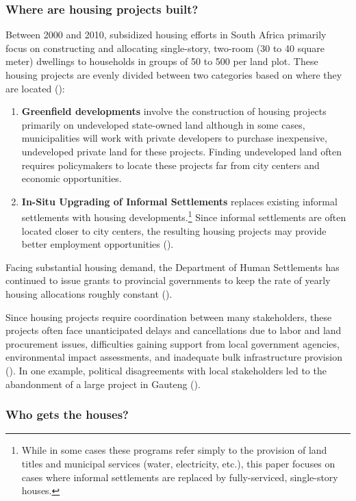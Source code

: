 \documentclass[12pt]{article}
\begin{document}
\subsubsection{Where are housing projects built?}

Between 2000 and 2010, subsidized housing efforts in South Africa primarily focus on constructing and allocating single-story, two-room (30 to 40 square meter) dwellings to households in groups of 50 to 500 per land plot.  These housing projects are evenly divided between two categories based on where they are located (\cite{dhsreports}):
\begin{enumerate}
	\item  \textbf{Greenfield developments} involve the construction of housing projects primarily on undeveloped state-owned land although in some cases, municipalities will work with private developers to purchase inexpensive, undeveloped private land for these projects.  Finding undeveloped land often requires policymakers to locate these projects far from city centers and economic opportunities.
	\item  \textbf{In-Situ Upgrading of Informal Settlements} replaces existing informal settlements with housing developments.\footnote{While in some cases these programs refer simply to the provision of land titles and municipal services (water, electricity, etc.), this paper focuses on cases where informal settlements are replaced by fully-serviced, single-story houses.}  Since informal settlements are often located closer to city centers, the resulting housing projects may provide better employment opportunities (\cite{serihistory}).
\end{enumerate}
Facing substantial housing demand, the Department of Human Settlements has continued to issue grants to provincial governments to keep the rate of yearly housing allocations roughly constant (\cite{dhsreports}).

Since housing projects require coordination between many stakeholders, these projects often face unanticipated delays and cancellations due to labor and land procurement issues, difficulties gaining support from local government agencies, environmental impact assessments, and inadequate bulk infrastructure provision (\cite{dhsreports}).  In one example, political disagreements with local stakeholders led to the abandonment of a large project in Gauteng (\cite{protest}).

\subsubsection{Who gets the houses?}
\end{document}

